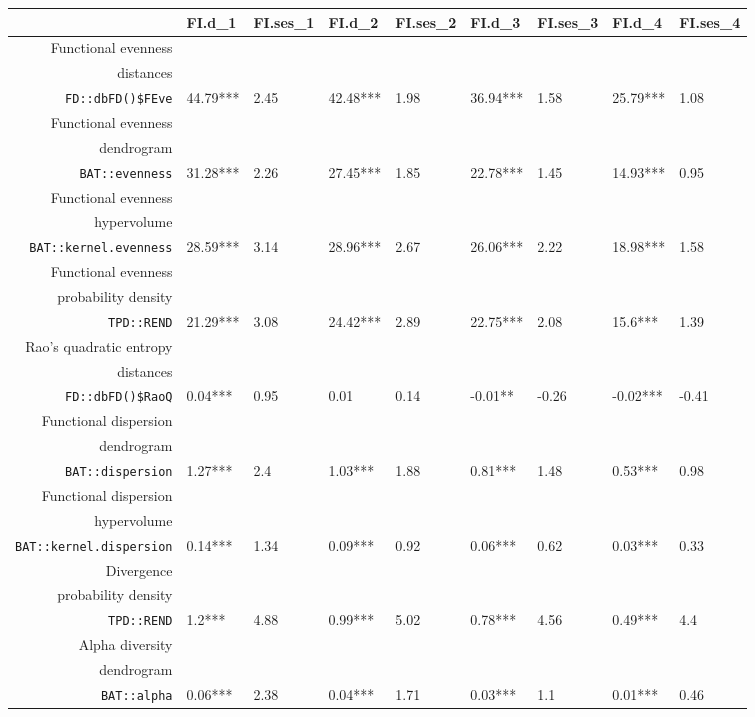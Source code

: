 \begin{table}[ht]
\scriptsize
\centering
\begin{tabular}{rllllllll}
  \hline
 & FI.d\_1 & FI.ses\_1 & FI.d\_2 & FI.ses\_2 & FI.d\_3 & FI.ses\_3 & FI.d\_4 & FI.ses\_4 \\ 
  \hline
Functional evenness\\distances\\\texttt{FD::dbFD()\$FEve} & 44.79*** & 2.45 & 42.48*** & 1.98 & 36.94*** & 1.58 & 25.79*** & 1.08 \\ 
  Functional evenness\\dendrogram\\\texttt{BAT::evenness} & 31.28*** & 2.26 & 27.45*** & 1.85 & 22.78*** & 1.45 & 14.93*** & 0.95 \\ 
  Functional evenness\\hypervolume\\\texttt{BAT::kernel.evenness} & 28.59*** & 3.14 & 28.96*** & 2.67 & 26.06*** & 2.22 & 18.98*** & 1.58 \\ 
  Functional evenness\\probability density\\\texttt{TPD::REND} & 21.29*** & 3.08 & 24.42*** & 2.89 & 22.75*** & 2.08 & 15.6*** & 1.39 \\ 
  Rao's quadratic entropy\\distances\\\texttt{FD::dbFD()\$RaoQ} & 0.04*** & 0.95 & 0.01 & 0.14 & -0.01** & -0.26 & -0.02*** & -0.41 \\ 
  Functional dispersion\\dendrogram\\\texttt{BAT::dispersion} & 1.27*** & 2.4 & 1.03*** & 1.88 & 0.81*** & 1.48 & 0.53*** & 0.98 \\ 
  Functional dispersion\\hypervolume\\\texttt{BAT::kernel.dispersion} & 0.14*** & 1.34 & 0.09*** & 0.92 & 0.06*** & 0.62 & 0.03*** & 0.33 \\ 
  Divergence\\probability density\\\texttt{TPD::REND} & 1.2*** & 4.88 & 0.99*** & 5.02 & 0.78*** & 4.56 & 0.49*** & 4.4 \\ 
  Alpha diversity\\dendrogram\\\texttt{BAT::alpha} & 0.06*** & 2.38 & 0.04*** & 1.71 & 0.03*** & 1.1 & 0.01*** & 0.46 \\ 

\end{tabular}
\end{table}
